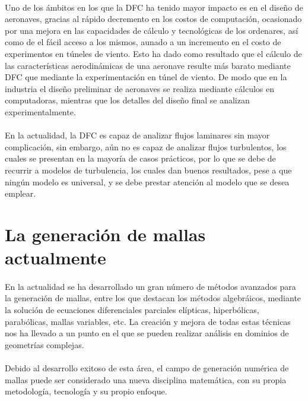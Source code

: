 \documentclass[letterpaper, openright, 12pt]{book}
\begin{document}
    \paragraph*{}
    Uno de los ámbitos en los que la DFC ha tenido mayor impacto es en el
    diseño de aeronaves, gracias al rápido decremento en los costos de
    computación, ocasionado por una mejora en las capacidades de cálculo y
    tecnológicas de los ordenares, así como de el fácil acceso a los mismos,
    aunado a un incremento en el costo de experimentos en túneles de viento.
    Esto ha dado como resultado que el cálculo de las características
    aerodinámicas de una aeronave resulte más barato mediante DFC que mediante
    la experimentación en túnel de viento. De modo que en la industria el
    diseño preliminar de aeronaves se realiza mediante cálculos en
    computadoras, mientras que los detalles del diseño final se analizan
    experimentalmente.\cite{anderson-yotros}

    \paragraph*{}
    En la actualidad, la DFC es capaz de analizar flujos laminares sin mayor
    complicación, sin embargo, aún no es capaz de analizar flujos turbulentos,
    los cuales se presentan en la mayoría de casos prácticos, por lo que se
    debe de recurrir a modelos de turbulencia, los cuales dan buenos
    resultados, pese a que ningún modelo es universal, y se debe prestar
    atención al modelo que se desea emplear.\cite{cengel}

    \section{La generación de mallas actualmente}
    \paragraph*{}
    En la actualidad se ha desarrollado un gran número de métodos avanzados
    para la generación de mallas, entre los que destacan los métodos
    algebráicos, mediante la solución de ecuaciones diferenciales parciales
    elípticas, hiperbólicas, parabólicas, mallas variables, etc. La creación y
    mejora de todas estas técnicas nos ha llevado a un punto en el que se
    pueden realizar análisis en dominios de geometrías complejas.

    \paragraph*{}
    Debido al desarrollo exitoso de esta área, el campo de generación numérica
    de mallas puede ser considerado una nueva disciplina matemática, con su
    propia metodología, tecnología y su propio enfoque.
\end{document}
